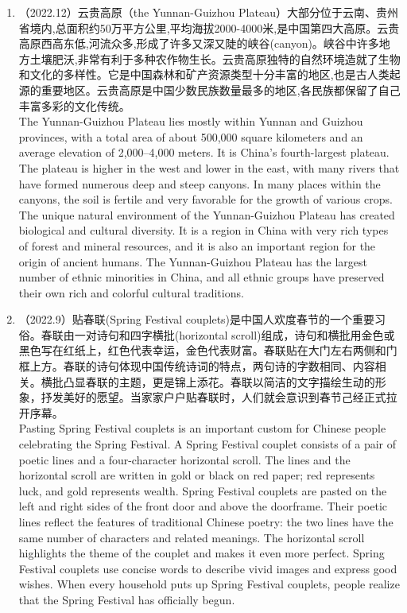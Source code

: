 ﻿\documentclass[lang=cn,11pt]{elegantbook}
\begin{document}
\begin{enumerate}
    \item （2022.12）云贵高原（the Yunnan-Guizhou Plateau）大部分位于云南、贵州省境内,总面积约50万平方公里,平均海拔2000-4000米,是中国第四大高原。云贵高原西高东低,河流众多,形成了许多又深又陡的峡谷(canyon)。峡谷中许多地方土壤肥沃,非常有利于多种农作物生长。云贵高原独特的自然环境造就了生物和文化的多样性。它是中国森林和矿产资源类型十分丰富的地区,也是古人类起源的重要地区。云贵高原是中国少数民族数量最多的地区,各民族都保留了自己丰富多彩的文化传统。\\The Yunnan-Guizhou Plateau lies mostly within Yunnan and Guizhou provinces, with a total area of about 500,000 square kilometers and an average elevation of 2,000–4,000 meters. It is China’s fourth-largest plateau. The plateau is higher in the west and lower in the east, with many rivers that have formed numerous deep and steep canyons. In many places within the canyons, the soil is fertile and very favorable for the growth of various crops. The unique natural environment of the Yunnan-Guizhou Plateau has created biological and cultural diversity. It is a region in China with very rich types of forest and mineral resources, and it is also an important region for the origin of ancient humans. The Yunnan-Guizhou Plateau has the largest number of ethnic minorities in China, and all ethnic groups have preserved their own rich and colorful cultural traditions.
    \item （2022.9）贴春联(Spring Festival couplets)是中国人欢度春节的一个重要习俗。春联由一对诗句和四字横批(horizontal scroll)组成，诗句和横批用金色或黑色写在红纸上，红色代表幸运，金色代表财富。春联贴在大门左右两侧和门框上方。春联的诗句体现中国传统诗词的特点，两句诗的字数相同、内容相关。横批凸显春联的主题，更是锦上添花。春联以简洁的文字描绘生动的形象，抒发美好的愿望。当家家户户贴春联时，人们就会意识到春节己经正式拉开序幕。\\Pasting Spring Festival couplets is an important custom for Chinese people celebrating the Spring Festival. A Spring Festival couplet consists of a pair of poetic lines and a four-character horizontal scroll. The lines and the horizontal scroll are written in gold or black on red paper; red represents luck, and gold represents wealth. Spring Festival couplets are pasted on the left and right sides of the front door and above the doorframe. Their poetic lines reflect the features of traditional Chinese poetry: the two lines have the same number of characters and related meanings. The horizontal scroll highlights the theme of the couplet and makes it even more perfect. Spring Festival couplets use concise words to describe vivid images and express good wishes. When every household puts up Spring Festival couplets, people realize that the Spring Festival has officially begun.

\end{enumerate}
\end{document}
